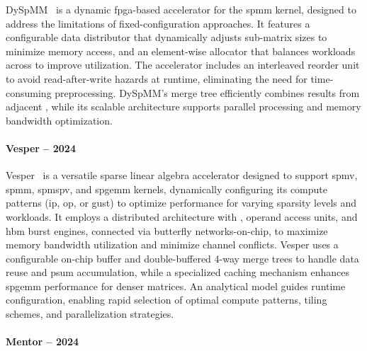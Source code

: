 DySpMM~\cite{Wang2024_DySpMM} is a dynamic \acrshort{fpga}-based accelerator for the \acrshort{spmm} kernel, designed to address the limitations of fixed-configuration approaches.
It features a configurable data distributor that dynamically adjusts sub-matrix sizes to minimize memory access, and an element-wise allocator that balances workloads across  to improve utilization.
The accelerator includes an interleaved reorder unit to avoid read-after-write hazards at runtime, eliminating the need for time-consuming preprocessing.
DySpMM's merge tree efficiently combines results from adjacent , while its scalable architecture supports parallel processing and memory bandwidth optimization.

\paragraph{Vesper -- 2024}

Vesper~\cite{Jin2024_Vesper} is a versatile sparse linear algebra accelerator designed to support \acrshort{spmv}, \acrshort{spmm}, \acrshort{spmspv}, and \acrshort{spgemm} kernels, dynamically configuring its compute patterns (\acrlong{ip}, \acrlong{op}, or \acrlong{gust}) to optimize performance for varying sparsity levels and workloads.
It employs a distributed architecture with , operand access units, and \acrshort{hbm} burst engines, connected via butterfly networks-on-chip, to maximize memory bandwidth utilization and minimize channel conflicts.
Vesper uses a configurable on-chip buffer and double-buffered 4-way merge trees to handle data reuse and \gls{psum} accumulation, while a specialized caching mechanism enhances \acrshort{spgemm} performance for denser matrices.
An analytical model guides runtime configuration, enabling rapid selection of optimal compute patterns, \gls{tiling} schemes, and parallelization strategies.

\paragraph{Mentor -- 2024}

